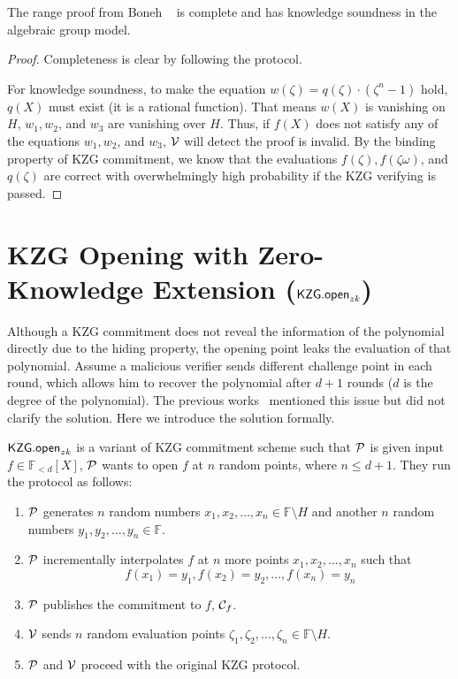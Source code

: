 \begin{lemma}
\label{lemma:range}
The range proof from Boneh \etal~\cite{rangeproof} is complete and has knowledge soundness in the algebraic group model.
\end{lemma}

\begin{proof}
Completeness is clear by following the protocol.

For knowledge soundness, to make the equation $w(\zeta)=q(\zeta)\cdot(\zeta^n-1)$ hold, $q(X)$ must exist (it is a rational function). That means $w(X)$ is vanishing on $H$, \ie $w_1,w_2$, and $w_3$ are vanishing over $H$. Thus, if $f(X)$ does not satisfy any of the equations $w_1,w_2$, and $w_3$, $\mathcal{V}$ will detect the proof is invalid. By the binding property of KZG commitment, we know that the evaluations $f(\zeta),f(\zeta\omega)$, and $q(\zeta)$ are correct with overwhelmingly high probability if the KZG verifying is passed.
\end{proof}

\section{KZG Opening with Zero-Knowledge Extension ($\openzk$)}
\label{sec:kgzzkp}
Although a KZG commitment does not reveal the information of the polynomial directly due to the hiding property, the opening point leaks the evaluation of that polynomial. Assume a malicious verifier sends different challenge point in each round, which allows him to recover the polynomial after $d+1$ rounds ($d$ is the degree of the polynomial). The previous works~\cite{rangeproof,linear} mentioned this issue but did not clarify the solution. Here we introduce the solution formally.
\begin{definition}[$\openzk$]
$\openzk$ is a variant of KZG commitment scheme such that $\mathcal{P}$ is given input $f\in\mathbb{F}_{<d}[X]$, $\mathcal{P}$ wants to open $f$ at $n$ random points, where $n\le{d+1}$. They run the protocol as follows:
\begin{enumerate}
    \item $\mathcal{P}$ generates $n$ random numbers $x_1,x_2,\dots,x_n\in\mathbb{F}\setminus{H}$ and another $n$ random numbers $y_1,y_2,\dots,y_n\in\mathbb{F}$.
    \item $\mathcal{P}$ incrementally interpolates $f$ at $n$ more points $x_1,x_2,\dots,x_n$ such that
    \[ f(x_1)=y_1,f(x_2)=y_2,\dots,f(x_n)=y_n \]
    \item $\mathcal{P}$ publishes the commitment to $f$, $\mathcal{C}_f$.
    \item $\mathcal{V}$ sends $n$ random evaluation points $\zeta_1,\zeta_2,\dots,\zeta_n\in\mathbb{F}\setminus{H}$.
    \item $\mathcal{P}$ and $\mathcal{V}$ proceed with the original KZG protocol.
\end{enumerate}
\end{definition}

